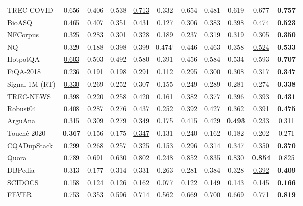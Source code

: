 \documentclass{article}
\begin{document}
\begin{table}[t!]
{\begin{tabular}{l | c | c c c | c c c c | c | c}
   TREC-COVID    & 0.656 & 0.406 & 0.538 & \underline{0.713} & 0.332& 0.654 & 0.481 & 0.619 & 0.677 & \textbf{0.757}\\
   BioASQ        & 0.465 & 0.407 & 0.351 & \textcolor{black}{0.431} & 0.127 & 0.306 & 0.383 & 0.398 & \underline{0.474} & \textbf{0.523} \\
   NFCorpus      & 0.325 & 0.283 & 0.301 & \underline{0.328} & 0.189 & 0.237 & 0.319 & 0.319 & 0.305 & \textbf{0.350} \\ \midrule
   NQ            & 0.329 & 0.188 & 0.398 & 0.399 & 0.474$^\ddagger$ & 0.446 & 0.463 & 0.358 & \underline{0.524} & \textbf{0.533} \\ 
   HotpotQA      & \underline{0.603} & 0.503 & 0.492 & 0.580 & 0.391 & 0.456 & 0.584 & 0.534 & 0.593 & \textbf{0.707} \\ 
   FiQA-2018     & 0.236 & 0.191 & 0.198 & 0.291 & 0.112 & 0.295 & 0.300 & 0.308 & \underline{0.317} & \textbf{0.347} \\ \midrule
   Signal-1M (RT)& \underline{0.330} & 0.269 & 0.252 & 0.307 & 0.155 & 0.249 & 0.289 & 0.281 & 0.274 & \textbf{0.338} \\ \midrule
   TREC-NEWS     & 0.398 & 0.220 & 0.258 & \underline{0.420} & 0.161 & 0.382 & 0.377 & 0.396 & 0.393 & \textbf{0.431} \\
   Robust04     & 0.408 & 0.287 & 0.276 & \underline{0.437} & 0.252 & 0.392 & 0.427 & 0.362 & 0.391 & \textbf{0.475} \\ \midrule
   ArguAna       & 0.315 & 0.309 & 0.279 & 0.349 & 0.175& 0.415 & \underline{0.429} & \textbf{0.493} & 0.233 & 0.311 \\  
   Touch\'e-2020 & \textbf{0.367} & 0.156 & 0.175 & \underline{0.347} & 0.131 & 0.240 & 0.162 & 0.182 & 0.202 & 0.271 \\ \midrule 
   CQADupStack   & 0.299 & 0.268 & 0.257 & 0.325 & 0.153 & 0.296 & 0.314 & 0.347 & \underline{0.350} & \textbf{0.370} \\
   Quora         & 0.789 & 0.691 & 0.630 & 0.802 & 0.248 & \underline{0.852} & 0.835 & 0.830 & \textbf{0.854} & 0.825 \\ \midrule
   DBPedia       & 0.313  & 0.177 & 0.314 & 0.331 & 0.263 & 0.281 & 0.384 & 0.328 & \underline{0.392} & \textbf{0.409} \\ \midrule
   SCIDOCS       & 0.158 & 0.124 & 0.126 & \underline{0.162} & 0.077 & 0.122 & 0.149 & 0.143 & 0.145 & \textbf{0.166} \\ \midrule
   FEVER         & 0.753 & 0.353 & 0.596 & \textcolor{black}{0.714} & 0.562& 0.669 & 0.700 & 0.669 & \underline{0.771} & \textbf{0.819} \\ 

\end{tabular}}
\end{table}
\end{document}
